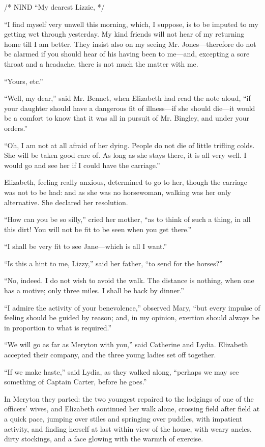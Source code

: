\documentclass[12pt]{book}
\begin{document}
/* NIND ``My dearest Lizzie, */

``I find myself very unwell this morning, which, I suppose, is to be imputed to my getting wet through yesterday. My kind friends will not hear of my returning home till I am better. They insist also on my seeing Mr. Jones---therefore do not be alarmed if you should hear of his having been to me---and, excepting a sore throat and a headache, there is not much the matter with me.

``Yours, etc.''

``Well, my dear,'' said Mr. Bennet, when Elizabeth had read the note aloud, ``if your daughter should have a dangerous fit of illness---if she should die---it would be a comfort to know that it was all in pursuit of Mr. Bingley, and under your orders.''

``Oh, I am not at all afraid of her dying. People do not die of little trifling colds. She will be taken good care of. As long as she stays there, it is all very well. I would go and see her if I could have the carriage.''

Elizabeth, feeling really anxious, determined to go to her, though the carriage was not to be had: and as she was no horsewoman, walking was her only alternative. She declared her resolution.

``How can you be so silly,'' cried her mother, ``as to think of such a thing, in all this dirt! You will not be fit to be seen when you get there.''

``I shall be very fit to see Jane---which is all I want.''

``Is this a hint to me, Lizzy,'' said her father, ``to send for the horses?''

``No, indeed. I do not wish to avoid the walk. The distance is nothing, when one has a motive; only three miles. I shall be back by dinner.''

``I admire the activity of your benevolence,'' observed Mary, ``but every impulse of feeling should be guided by reason; and, in my opinion, exertion should always be in proportion to what is required.''

``We will go as far as Meryton with you,'' said Catherine and Lydia. Elizabeth accepted their company, and the three young ladies set off together.

``If we make haste,'' said Lydia, as they walked along, ``perhaps we may see something of Captain Carter, before he goes.''

In Meryton they parted: the two youngest repaired to the lodgings of one of the officers' wives, and Elizabeth continued her walk alone, crossing field after field at a quick pace, jumping over stiles and springing over puddles, with impatient activity, and finding herself at last within view of the house, with weary ancles, dirty stockings, and a face glowing with the warmth of exercise.
\end{document}
